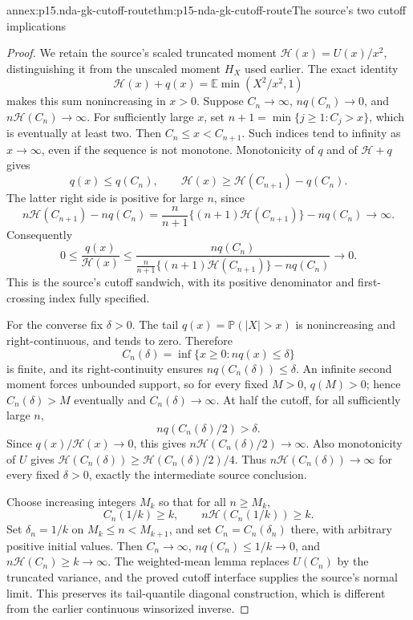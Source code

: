 \begin{annexitem}{annex:p15.nda-gk-cutoff-route}{thm:p15-nda-gk-cutoff-route}{The source's two cutoff implications}
\begin{proof}
We retain the source's scaled truncated moment
\(\mathcal H(x)=U(x)/x^2\), distinguishing it from the
unscaled moment \(H_X\) used earlier.
The exact identity
\[
 \mathcal H(x)+q(x)
       =\mathbb E\min(X^2/x^2,1)
 \]
makes this sum nonincreasing in \(x>0\).
Suppose \(C_n\to\infty\),
\(nq(C_n)\to0\), and \(n\mathcal H(C_n)\to\infty\).
For sufficiently large \(x\), set
\(n+1=\min\{j\geq1:C_j>x\}\), which is eventually at least two.
Then \(C_n\leq x<C_{n+1}\). Such indices tend to
infinity as \(x\to\infty\), even if the sequence is not monotone.
Monotonicity of \(q\) and of \(\mathcal H+q\) gives
\[
 q(x)\leq q(C_n),\qquad
 \mathcal H(x)\geq\mathcal H(C_{n+1})-q(C_n).
 \]
The latter right side is positive for large \(n\), since
\[
 n\mathcal H(C_{n+1})-nq(C_n)
 =\frac n{n+1}\{(n+1)\mathcal H(C_{n+1})\}-nq(C_n)
 \longrightarrow\infty.
 \]
Consequently
\[
 0\leq\frac{q(x)}{\mathcal H(x)}
 \leq\frac{nq(C_n)}
       {\frac n{n+1}\{(n+1)\mathcal H(C_{n+1})\}-nq(C_n)}
 \longrightarrow0.
 \]
This is the source's cutoff sandwich, with its positive
denominator and first-crossing index fully specified.

For the converse fix \(\delta>0\).
The tail \(q(x)=\mathbb P(|X|>x)\) is nonincreasing and
right-continuous, and tends to zero. Therefore
\[
 C_n(\delta)=\inf\{x\geq0:nq(x)\leq\delta\}
 \]
is finite, and its right-continuity ensures
\(nq(C_n(\delta))\leq\delta\).
An infinite second moment forces unbounded support, so for
every fixed \(M>0\), \(q(M)>0\); hence \(C_n(\delta)>M\)
eventually and \(C_n(\delta)\to\infty\).
At half the cutoff, for all sufficiently large \(n\),
\[
 nq(C_n(\delta)/2)>\delta.
 \]
Since \(q(x)/\mathcal H(x)\to0\), this gives
\(n\mathcal H(C_n(\delta)/2)\to\infty\).
Also monotonicity of \(U\) gives
\(\mathcal H(C_n(\delta))\geq
\mathcal H(C_n(\delta)/2)/4\).
Thus \(n\mathcal H(C_n(\delta))\to\infty\) for every fixed
\(\delta>0\), exactly the intermediate source conclusion.

Choose increasing integers \(M_k\) so that for all \(n\geq M_k\),
\[
 C_n(1/k)\geq k,\qquad n\mathcal H(C_n(1/k))\geq k.
 \]
Set \(\delta_n=1/k\) on \(M_k\leq n<M_{k+1}\), and set
\(C_n=C_n(\delta_n)\) there, with arbitrary positive initial
values. Then \(C_n\to\infty\),
\(nq(C_n)\leq1/k\to0\), and
\(n\mathcal H(C_n)\geq k\to\infty\).
The weighted-mean lemma replaces \(U(C_n)\) by the truncated
variance, and the proved cutoff interface supplies the source's
normal limit. This preserves its tail-quantile diagonal construction,
which is different from the earlier continuous winsorized inverse.


\end{proof}
\end{annexitem}
